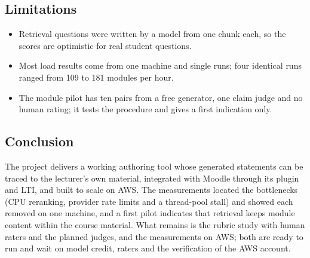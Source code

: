 \subsection{Limitations}
\begin{itemize}[leftmargin=*,nosep]
\item Retrieval questions were written by a model from one chunk each, so the scores are optimistic for real student questions.
\item Most load results come from one machine and single runs; four identical runs ranged from 109 to 181 modules per hour.
\item The module pilot has ten pairs from a free generator, one claim judge and no human rating; it tests the procedure and gives a first indication only.
\end{itemize}
\subsection{Conclusion}
The project delivers a working authoring tool whose generated statements can be traced to the lecturer's own material, integrated with Moodle through its plugin and LTI, and built to scale on AWS. The measurements located the bottlenecks (CPU reranking, provider rate limits and a thread-pool stall) and showed each removed on one machine, and a first pilot indicates that retrieval keeps module content within the course material. What remains is the rubric study with human raters and the planned judges, and the measurements on AWS; both are ready to run and wait on model credit, raters and the verification of the AWS account.
